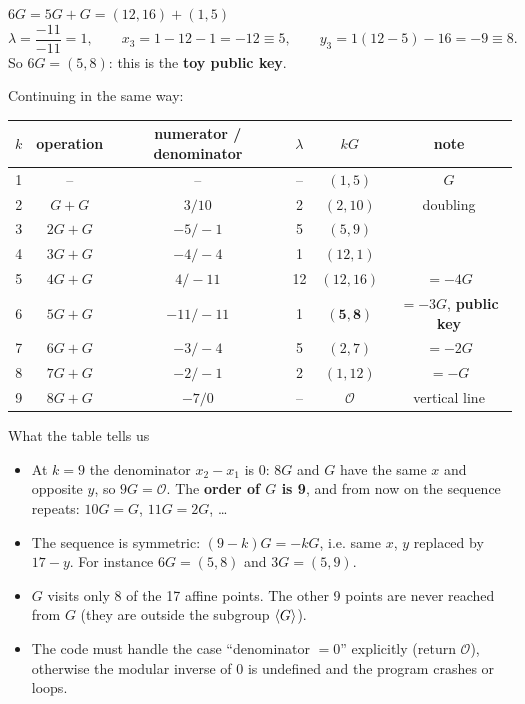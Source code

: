 \begin{framedex}{$6G = 5G + G = (12,16) + (1,5)$}
  \[
    \lambda = \frac{-11}{-11} = 1, \qquad
    x_3 = 1 - 12 - 1 = -12 \equiv 5, \qquad
    y_3 = 1(12 - 5) - 16 = -9 \equiv 8 .
  \]
  So $6G = (5, 8)$: this is the \textbf{toy public key}.
\end{framedex}

Continuing in the same way:

\begin{center}
  \begin{tabular}{c c c c c c}
    \toprule
    $k$ & operation & numerator / denominator & $\lambda$ & $kG$ & note \\
    \midrule
    1 & -- & -- & -- & $(1, 5)$ & $G$ \\
    2 & $G + G$ & $3 / 10$ & 2 & $(2, 10)$ & doubling \\
    3 & $2G + G$ & $-5 / -1$ & 5 & $(5, 9)$ & \\
    4 & $3G + G$ & $-4 / -4$ & 1 & $(12, 1)$ & \\
    5 & $4G + G$ & $4 / -11$ & 12 & $(12, 16)$ & $= -4G$ \\
    6 & $5G + G$ & $-11 / -11$ & 1 & $\mathbf{(5, 8)}$ & $= -3G$, \textbf{public key} \\
    7 & $6G + G$ & $-3 / -4$ & 5 & $(2, 7)$ & $= -2G$ \\
    8 & $7G + G$ & $-2 / -1$ & 2 & $(1, 12)$ & $= -G$ \\
    9 & $8G + G$ & $-7 / 0$ & -- & $\mathcal{O}$ & vertical line \\
    \bottomrule
  \end{tabular}
\end{center}

\begin{framedobs}{What the table tells us}
  \begin{itemize}
    \item At $k = 9$ the denominator $x_2 - x_1$ is $0$: $8G$ and $G$ have the same $x$ and opposite $y$, so $9G = \mathcal{O}$. The \textbf{order of $G$ is 9}, and from now on the sequence repeats: $10G = G$, $11G = 2G$, \ldots
    \item The sequence is symmetric: $(9 - k) G = -kG$, i.e. same $x$, $y$ replaced by $17 - y$. For instance $6G = (5,8)$ and $3G = (5,9)$.
    \item $G$ visits only 8 of the 17 affine points. The other 9 points are never reached from $G$ (they are outside the subgroup $\left\langle G \right\rangle$).
    \item The code must handle the case ``denominator $= 0$'' explicitly (return $\mathcal{O}$), otherwise the modular inverse of 0 is undefined and the program crashes or loops.
  \end{itemize}
\end{framedobs}

